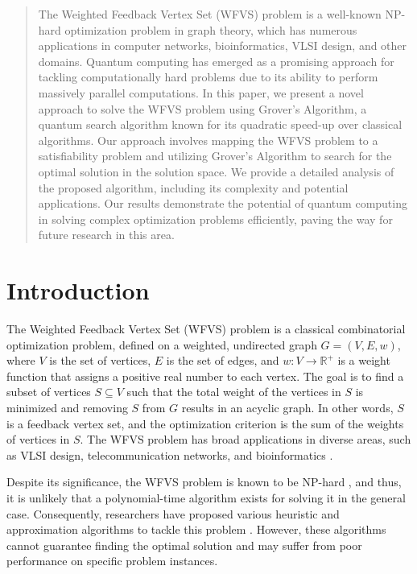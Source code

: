 \begin{abstract}
The Weighted Feedback Vertex Set (WFVS) problem is a well-known NP-hard optimization problem in graph theory, which has numerous applications in computer networks, bioinformatics, VLSI design, and other domains. Quantum computing has emerged as a promising approach for tackling computationally hard problems due to its ability to perform massively parallel computations. In this paper, we present a novel approach to solve the WFVS problem using Grover's Algorithm, a quantum search algorithm known for its quadratic speed-up over classical algorithms. Our approach involves mapping the WFVS problem to a satisfiability problem and utilizing Grover's Algorithm to search for the optimal solution in the solution space. We provide a detailed analysis of the proposed algorithm, including its complexity and potential applications. Our results demonstrate the potential of quantum computing in solving complex optimization problems efficiently, paving the way for future research in this area.

\end{abstract}

\section{Introduction}

The Weighted Feedback Vertex Set (WFVS) problem is a classical combinatorial optimization problem, defined on a weighted, undirected graph $G = (V, E, w)$, where $V$ is the set of vertices, $E$ is the set of edges, and $w: V \rightarrow \mathbb{R}^{+}$ is a weight function that assigns a positive real number to each vertex. The goal is to find a subset of vertices $S \subseteq V$ such that the total weight of the vertices in $S$ is minimized and removing $S$ from $G$ results in an acyclic graph. In other words, $S$ is a feedback vertex set, and the optimization criterion is the sum of the weights of vertices in $S$. The WFVS problem has broad applications in diverse areas, such as VLSI design, telecommunication networks, and bioinformatics \cite{yannakakis1994feedback, karp1972reducibility, ertekin2007decomposition}.

Despite its significance, the WFVS problem is known to be NP-hard \cite{karp1972reducibility}, and thus, it is unlikely that a polynomial-time algorithm exists for solving it in the general case. Consequently, researchers have proposed various heuristic and approximation algorithms to tackle this problem \cite{cormen2009introduction, li2019improved, nakao1999weighted}. However, these algorithms cannot guarantee finding the optimal solution and may suffer from poor performance on specific problem instances.

